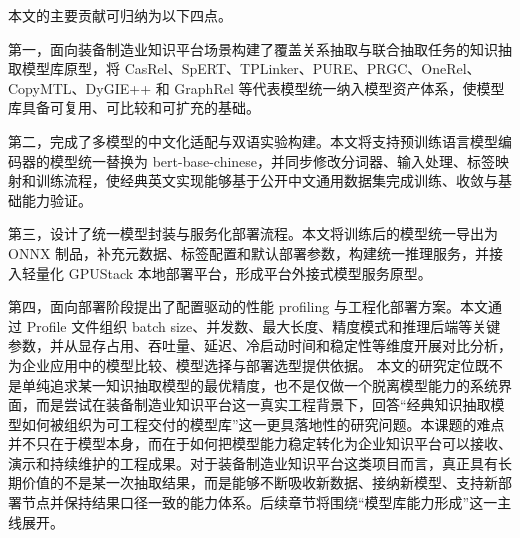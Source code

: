 本文的主要贡献可归纳为以下四点。

第一，面向装备制造业知识平台场景构建了覆盖关系抽取与联合抽取任务的知识抽取模型库原型，将 CasRel、SpERT、TPLinker、PURE、PRGC、OneRel、CopyMTL、DyGIE++ 和 GraphRel 等代表模型统一纳入模型资产体系，使模型库具备可复用、可比较和可扩充的基础。

第二，完成了多模型的中文化适配与双语实验构建。本文将支持预训练语言模型编码器的模型统一替换为 bert-base-chinese，并同步修改分词器、输入处理、标签映射和训练流程，使经典英文实现能够基于公开中文通用数据集完成训练、收敛与基础能力验证。

第三，设计了统一模型封装与服务化部署流程。本文将训练后的模型统一导出为 ONNX 制品，补充元数据、标签配置和默认部署参数，构建统一推理服务，并接入轻量化 GPUStack 本地部署平台，形成平台外接式模型服务原型。

第四，面向部署阶段提出了配置驱动的性能 profiling 与工程化部署方案。本文通过 Profile 文件组织 batch size、并发数、最大长度、精度模式和推理后端等关键参数，并从显存占用、吞吐量、延迟、冷启动时间和稳定性等维度开展对比分析，为企业应用中的模型比较、模型选择与部署选型提供依据。
本文的研究定位既不是单纯追求某一知识抽取模型的最优精度，也不是仅做一个脱离模型能力的系统界面，而是尝试在装备制造业知识平台这一真实工程背景下，回答“经典知识抽取模型如何被组织为可工程交付的模型库”这一更具落地性的研究问题。本课题的难点并不只在于模型本身，而在于如何把模型能力稳定转化为企业知识平台可以接收、演示和持续维护的工程成果。对于装备制造业知识平台这类项目而言，真正具有长期价值的不是某一次抽取结果，而是能够不断吸收新数据、接纳新模型、支持新部署节点并保持结果口径一致的能力体系。后续章节将围绕“模型库能力形成”这一主线展开。
